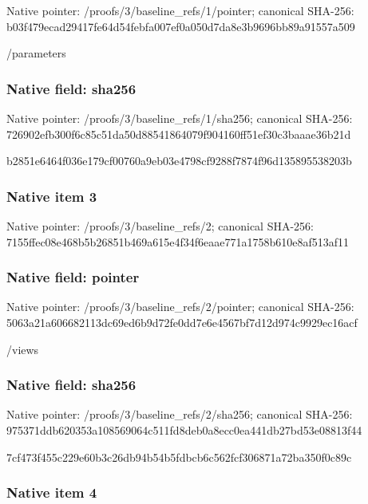 \documentclass[10pt,a4paper]{article}
\begin{document}
Native pointer: /proofs/3/baseline\_refs/1/pointer; canonical SHA-256: b03f479ecad29417fe64d54f\allowbreak{}ebfa007ef0a050d7da8e3b96\allowbreak{}96bb89a91557a509


/parameters


\subsubsection{Native field: sha256}


Native pointer: /proofs/3/baseline\_refs/1/sha256; canonical SHA-256: 726902efb300f6c85c51da50\allowbreak{}d88541864079f904160ff51e\allowbreak{}f30c3baaae36b21d


b2851e6464f036e179cf0076\allowbreak{}0a9eb03e4798cf9288f7874f\allowbreak{}96d135895538203b


\subsubsection{Native item 3}


Native pointer: /proofs/3/baseline\_refs/2; canonical SHA-256: 7155ffec08e468b5b26851b4\allowbreak{}69a615e4f34f6eaae771a175\allowbreak{}8b610e8af513af11



\subsubsection{Native field: pointer}


Native pointer: /proofs/3/baseline\_refs/2/pointer; canonical SHA-256: 5063a21a606682113dc69ed6\allowbreak{}b9d72fe0dd7e6e4567bf7d12\allowbreak{}d974c9929ec16acf


/views


\subsubsection{Native field: sha256}


Native pointer: /proofs/3/baseline\_refs/2/sha256; canonical SHA-256: 975371ddb620353a10856906\allowbreak{}4c511fd8deb0a8ecc0ea441d\allowbreak{}b27bd53e08813f44


7cf473f455c229e60b3c26db\allowbreak{}94b54b5fdbcb6c562fcf3068\allowbreak{}71a72ba350f0c89c


\subsubsection{Native item 4}
\end{document}
